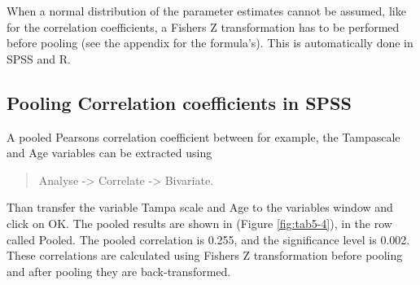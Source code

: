 \documentclass[]{book}
\begin{document}
When a normal distribution of the parameter estimates cannot be assumed,
like for the correlation coefficients, a Fishers Z transformation has to
be performed before pooling (see the appendix for the formula's). This
is automatically done in SPSS and R.

\subsection{Pooling Correlation coefficients in
SPSS}\label{pooling-correlation-coefficients-in-spss}

A pooled Pearsons correlation coefficient between for example, the
Tampascale and Age variables can be extracted using

\begin{quote}
Analyse -\textgreater{} Correlate -\textgreater{} Bivariate.
\end{quote}

Than transfer the variable Tampa scale and Age to the variables window
and click on OK. The pooled results are shown in (Figure
\ref{fig:tab5-4}), in the row called Pooled. The pooled correlation is
0.255, and the significance level is 0.002. These correlations are
calculated using Fishers Z transformation before pooling and after
pooling they are back-transformed.
\end{document}

